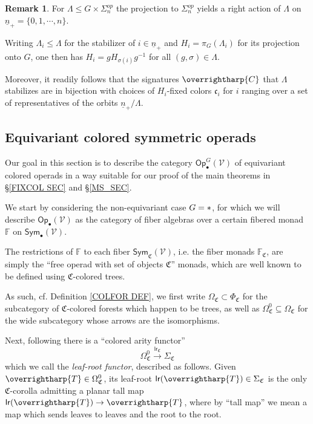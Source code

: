 \documentclass[a4paper,10pt
,draft
]{article}%
\numberwithin{equation}{section}
\numberwithin{figure}{section}
\theoremstyle{definition} %
\newtheorem{remark}[equation]{Remark}%
\newcommand{\vect}[1]{\text{\overrightharp{\ensuremath{#1}}}}
\newcommand{\V}{\ensuremath{\mathcal V}}
\newcommand{\1}{\ensuremath{\mathbbm 1}}%
\begin{document}
\begin{remark}\label{CHOOSESIGN REM}
For $\Lambda \leq G \times \Sigma_n^{op}$ 
the projection to $\Sigma_n^{op}$ yields a
right action of $\Lambda$ on 
$\underline{n}_+ = \{0,1,\cdots,n\}$.

Writing $\Lambda_i\leq \Lambda$ for the stabilizer of $i \in \underline{n}_{+}$ and $H_i = \pi_G(\Lambda_i)$
for its projection onto $G$,
one then has $H_i = g H_{\sigma(i)} g^{-1}$ for all
$(g, \sigma) \in \Lambda$.

Moreover, it readily follows that the 
signatures $\vect{C}$ that $\Lambda$ stabilizes
are in bijection with choices of 
$H_i$-fixed colors $\mathfrak{c}_i$ 
for $i$ ranging over a set of representatives of
the orbits $\underline{n}_+ /\Lambda$.
\end{remark}




\subsection{Equivariant colored symmetric operads}
\label{EQCOSYMOP SEC}

Our goal in this section is to describe the category 
$\mathsf{Op}^{G}_{\bullet}(\V)$
of equivariant colored operads in a way suitable for our 
proof of the main theorems in \S \ref{FIXCOL SEC} and \S \ref{MS_SEC}.

We start by considering the non-equivariant case
$G = \**$,
for which we will describe
$\mathsf{Op}_{\bullet}(\V)$
as the category of fiber algebras over a certain fibered monad $\mathbb{F}$ on 
$\mathsf{Sym}_\bullet(\mathcal{V})$.

The restrictions of $\mathbb{F}$ to each fiber
$\mathsf{Sym}_{\mathfrak{C}}(\V)$,
i.e. the fiber monads $\mathbb{F}_{\mathfrak{C}}$,
are simply the ``free operad with set of objects $\mathfrak{C}$'' monads,
which are well known to be defined using 
$\mathfrak{C}$-colored trees.

As such, cf. Definition \ref{COLFOR DEF},
we first write 
$\Omega_{\mathfrak{C}} \subset \Phi_{\mathfrak{C}}$
for the subcategory of $\mathfrak{C}$-colored forests which happen to be trees,
as well as 
$\Omega^0_{\mathfrak{C}} \subseteq \Omega_{\mathfrak{C}}$
for the wide subcategory whose arrows are the isomorphisms.



Next, following \cite[Notation 3.33]{BP_geo}
there is a ``colored arity functor''
\begin{equation}\label{LRDEF EQ}
\Omega_{\mathfrak C}^0 \xrightarrow{\mathsf{lr}_{\mathfrak C}} \Sigma_{\mathfrak{C}}
\end{equation}
which we call the \emph{leaf-root functor}, described as follows.
Given $\vect{T} \in \Omega^0_{\mathfrak{C}}$, 
its leaf-root
$\mathsf{lr}(\vect{T}) \in \Sigma_{\mathfrak{C}}$
is the only $\mathfrak{C}$-corolla
admitting a planar tall map
$\mathsf{lr}(\vect{T}) \to \vect{T}$,
where by ``tall map'' we mean a map
which sends leaves to leaves and the root to the root.
\end{document}

